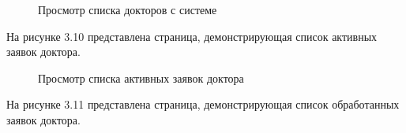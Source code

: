 \begin{figure}[!h]
	\caption{Просмотр списка докторов с системе}
\end{figure}

На рисунке 3.10 представлена страница, демонстрирующая список активных заявок доктора.

\begin{figure}[!h]
	\caption{Просмотр списка активных заявок доктора}
\end{figure}

\clearpage

На рисунке 3.11 представлена страница, демонстрирующая список обработанных заявок доктора.

